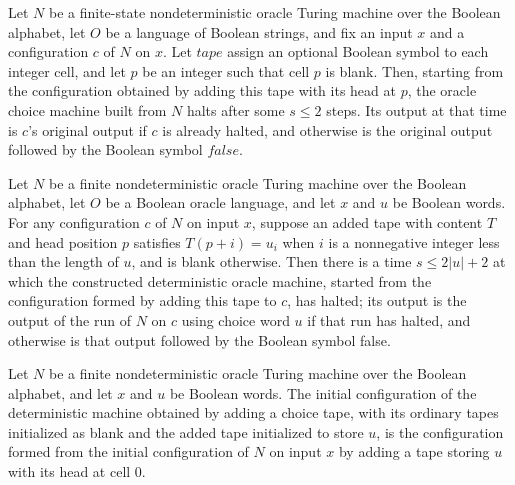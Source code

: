 \begin{theorem}
\label{Turing.oracleChoice_exhaust}
\leanok
{}
Let $N$ be a finite-state nondeterministic oracle Turing machine over the Boolean
alphabet, let $O$ be a language of Boolean strings, and fix an input $x$ and a
configuration $c$ of $N$ on $x$. Let $tape$ assign an optional Boolean symbol to each
integer cell, and let $p$ be an integer such that cell $p$ is blank. Then, starting from
the configuration obtained by adding this tape with its head at $p$, the oracle choice
machine built from $N$ halts after some $s \le 2$ steps. Its output at that time is
$c$'s original output if $c$ is already halted, and otherwise is the original output
followed by the Boolean symbol $false$.
\end{theorem}

\begin{theorem}
\label{Turing.oracleChoice_run}
\leanok
{}
Let $N$ be a finite nondeterministic oracle Turing machine over the Boolean alphabet,
let $O$ be a Boolean oracle language, and let $x$ and $u$ be Boolean words. For any
configuration $c$ of $N$ on input $x$, suppose an added tape with content $T$ and head
position $p$ satisfies $T(p+i)=u_i$ when $i$ is a nonnegative integer less than the
length of $u$, and is blank otherwise. Then there is a time $s\le 2|u|+2$ at which the
constructed deterministic oracle machine, started from the configuration formed by
adding this tape to $c$, has halted; its output is the output of the run of $N$ on $c$
using choice word $u$ if that run has halted, and otherwise is that output followed by
the Boolean symbol false.
\end{theorem}

\begin{theorem}
\label{Turing.oracleChoice_initial}
\leanok
{}
Let $N$ be a finite nondeterministic oracle Turing machine over the Boolean alphabet,
and let $x$ and $u$ be Boolean words. The initial configuration of the deterministic
machine obtained by adding a choice tape, with its ordinary tapes initialized as blank
and the added tape initialized to store $u$, is the configuration formed from the
initial configuration of $N$ on input $x$ by adding a tape storing $u$ with its head at
cell $0$.
\end{theorem}

